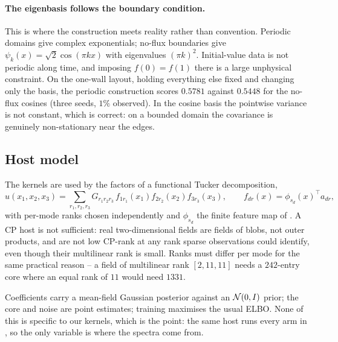 \paragraph{The eigenbasis follows the boundary condition.}
This is where the construction meets reality rather than convention.  Periodic
domains give complex exponentials; no-flux boundaries give
$\psi_k(x) = \sqrt{2}\cos(\pi k x)$ with eigenvalues $(\pi k)^2$.  Initial-value
data is not periodic along time, and imposing $f(0) = f(1)$ there is a large
unphysical constraint.  On the one-wall layout, holding everything else fixed
and changing only the basis, the periodic construction scores $0.5781$ against
$0.5448$ for the no-flux cosines (three seeds, $1\%$ observed).  In the cosine
basis the pointwise variance is not constant, which is correct: on a bounded
domain the covariance is genuinely non-stationary near the edges.

\subsection{Host model}
The kernels are used by the factors of a functional Tucker decomposition,
\begin{equation}
  u(x_1,x_2,x_3) = \sum_{r_1,r_2,r_3} G_{r_1 r_2 r_3}\,
  f_{1 r_1}(x_1) f_{2 r_2}(x_2) f_{3 r_3}(x_3),
  \qquad
  f_{d r}(x) = \phi_{s_d}(x)^\top a_{dr},
  \label{eq:tucker}
\end{equation}
with per-mode ranks chosen independently and $\phi_{s_d}$ the finite feature map
of .  A CP host is not sufficient: real two-dimensional fields are
fields of blobs, not outer products, and are not low CP-rank at any rank sparse
observations could identify, even though their multilinear rank is small.  Ranks
must differ per mode for the same practical reason -- a field of multilinear rank
$[2,11,11]$ needs a $242$-entry core where an equal rank of $11$ would need
$1331$.

Coefficients carry a mean-field Gaussian posterior against an $\mathcal{N}(0,I)$ prior;
the core and noise are point estimates; training maximises the usual ELBO.  None
of this is specific to our kernels, which is the point: the same host runs every
arm in , so the only variable is where the spectra come from.
